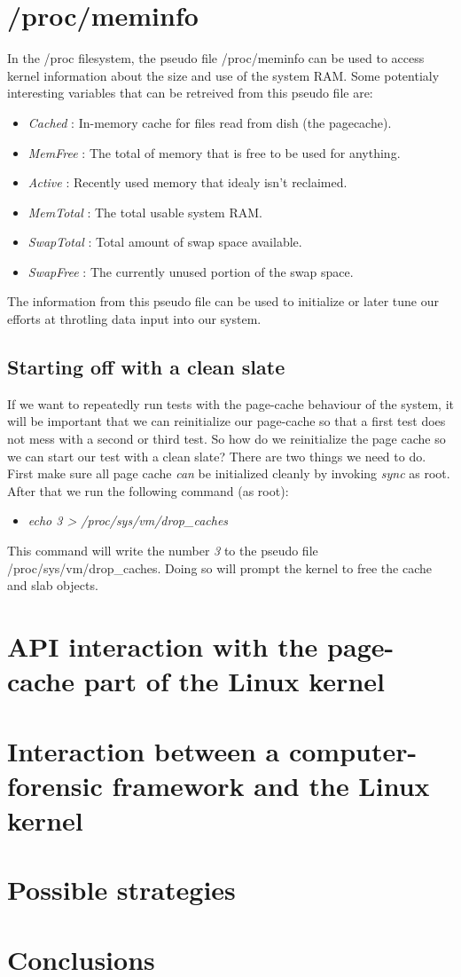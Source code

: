 \section{/proc/meminfo}
In the /proc filesystem, the pseudo file /proc/meminfo can be used to access kernel information about the size and use of the system RAM. Some potentialy interesting variables that can be retreived from this pseudo file are:
\begin{itemize}
\item \emph{Cached} : In-memory cache for files read from dish (the pagecache).
\item \emph{MemFree} : The total of memory that is free to be used for anything.
\item \emph{Active} : Recently used memory that idealy isn't reclaimed.
\item \emph{MemTotal} : The total usable system RAM.
\item \emph{SwapTotal} : Total amount of swap space available.
\item \emph{SwapFree} : The currently unused portion of the swap space.
\end{itemize}
The information from this pseudo file can be used to initialize or later tune our efforts at throtling data input into our system. 
\subsection{Starting off with a clean slate}
If we want to repeatedly run tests with the page-cache behaviour of the system, it will be important that we can reinitialize our page-cache so that a first test does not mess with a second or third test. So how do we reinitialize the page cache so we can start our test with a clean slate? There are two things we need to do.  First make sure all page cache \emph{can} be initialized cleanly by invoking \emph{sync} as root. After that we run the following command (as root):
\begin{itemize}
\item \emph{echo 3 > /proc/sys/vm/drop\_caches}
\end{itemize}
This command will write the number \emph{3} to the pseudo file /proc/sys/vm/drop\_caches. Doing so will prompt the kernel to free the cache and slab objects. 
\section{API interaction with the page-cache part of the Linux kernel}

\section{Interaction between a computer-forensic framework and the Linux kernel}
\section{Possible strategies}
\section{Conclusions}

